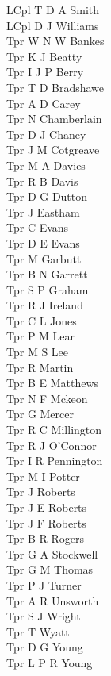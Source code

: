 \begin{multicols}{2}
  LCpl T D A Smith \\
  LCpl D J Williams \\
  Tpr W N W Bankes \\
  Tpr K J Beatty \\
  Tpr I J P Berry \\
  Tpr T D Bradshawe \\
  Tpr A D Carey \\
  Tpr N Chamberlain \\
  Tpr D J Chaney \\
  Tpr J M Cotgreave \\
  Tpr M A Davies \\
  Tpr R B Davis \\
  Tpr D G Dutton \\
  Tpr J Eastham \\
  Tpr C Evans \\
  Tpr D E Evans \\
  Tpr M Garbutt \\
  Tpr B N Garrett \\
  Tpr S P Graham \\
  Tpr R J Ireland \\
  Tpr C L Jones \\
  Tpr P M Lear \\
  Tpr M S Lee \\
  Tpr R Martin \\
  Tpr B E Matthews \\
  Tpr N F Mckeon \\
  Tpr G Mercer \\
  Tpr R C Millington \\
  Tpr R J O'Connor \\
  Tpr I R Pennington \\
  Tpr M I Potter \\
  Tpr J Roberts \\
  Tpr J E Roberts \\
  Tpr J F Roberts \\
  Tpr B R Rogers \\
  Tpr G A Stockwell \\
  Tpr G M Thomas \\
  Tpr P J Turner \\
  Tpr A R Unsworth \\
  Tpr S J Wright \\
  Tpr T Wyatt \\
  Tpr D G Young \\
  Tpr L P R Young \\
  \\

\end{multicols}
